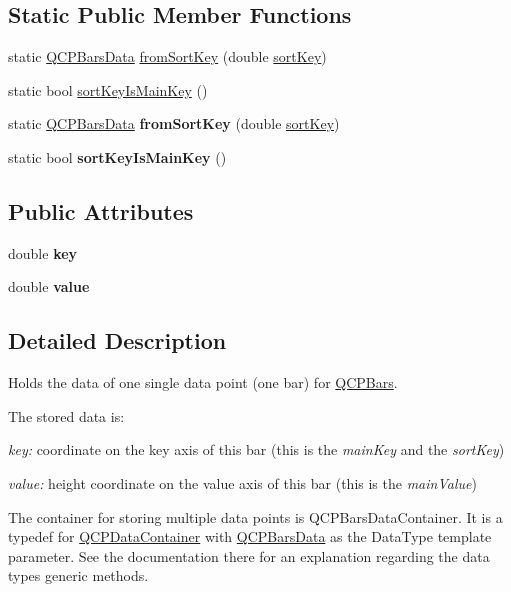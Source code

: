 \subsection*{Static Public Member Functions}
\begin{DoxyCompactItemize}
\item 
static \hyperlink{class_q_c_p_bars_data}{Q\+C\+P\+Bars\+Data} \hyperlink{class_q_c_p_bars_data_ad170d4e90498005ec319338910252ba8}{from\+Sort\+Key} (double \hyperlink{class_q_c_p_bars_data_a107d22d84f336bf6e3c3ad0133a5d2f6}{sort\+Key})
\item 
static bool \hyperlink{class_q_c_p_bars_data_aebaabda335bd4c9f81bd585d16b63aa8}{sort\+Key\+Is\+Main\+Key} ()
\item 
\mbox{\label{class_q_c_p_bars_data_ad170d4e90498005ec319338910252ba8}} 
static \hyperlink{class_q_c_p_bars_data}{Q\+C\+P\+Bars\+Data} {\bfseries from\+Sort\+Key} (double \hyperlink{class_q_c_p_bars_data_a107d22d84f336bf6e3c3ad0133a5d2f6}{sort\+Key})
\item 
\mbox{\label{class_q_c_p_bars_data_a2d24f70f768f0a41defa85f84868039d}} 
static bool {\bfseries sort\+Key\+Is\+Main\+Key} ()
\end{DoxyCompactItemize}
\subsection*{Public Attributes}
\begin{DoxyCompactItemize}
\item 
\mbox{\label{class_q_c_p_bars_data_a09b492217dc03ee1c0348a2f2e6e0a04}} 
double {\bfseries key}
\item 
\mbox{\label{class_q_c_p_bars_data_ab636644fb40630f3b1b72f44d65ec072}} 
double {\bfseries value}
\end{DoxyCompactItemize}


\subsection{Detailed Description}
Holds the data of one single data point (one bar) for \hyperlink{class_q_c_p_bars}{Q\+C\+P\+Bars}. 

The stored data is\+: \begin{DoxyItemize}
\item {\itshape key\+:} coordinate on the key axis of this bar (this is the {\itshape main\+Key} and the {\itshape sort\+Key}) \item {\itshape value\+:} height coordinate on the value axis of this bar (this is the {\itshape main\+Value})\end{DoxyItemize}
The container for storing multiple data points is Q\+C\+P\+Bars\+Data\+Container. It is a typedef for \hyperlink{class_q_c_p_data_container}{Q\+C\+P\+Data\+Container} with \hyperlink{class_q_c_p_bars_data}{Q\+C\+P\+Bars\+Data} as the Data\+Type template parameter. See the documentation there for an explanation regarding the data type\textquotesingle{}s generic methods.


